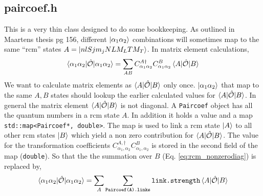 \documentclass[10pt]{article}
\begin{document}
\subsection{paircoef.h}
This is a very thin class designed to do some bookkeeping. As outlined in Maartens thesis pg 156, different $\ket{\alpha_1 \alpha_2}$ combinations will sometimes map to the same ``rcm'' states $A = \ket{ nlSjm_j NLM_L TM_T}$. In matrix element calculations,
\begin{align}
	\braket{\alpha_1 \alpha_2 | \hat{\mathcal{O}} | \alpha_1 \alpha_2} = \sum_{AB} C_{\alpha_1 \alpha_2}^{A \dagger} C_{\alpha_1 \alpha_2}^{B} \braket {A | \hat{\mathcal{O}} | B }
	\label{eq:rcm_nonzerodiag}
\end{align}
We want to calculate matrix elements as $\braket{ A | \hat{\mathcal{O}} | B}$ only once. $\ket{\alpha_1 \alpha_2}$ that map to the same $A,B$ states should lookup the earlier calculated values for $\braket{ A | \hat{\mathcal{O}} | B}$.
In general the matrix element $\braket{ A | \hat{\mathcal{O}} | B }$ is not diagonal. 
A \texttt{Paircoef} object has all the quantum numbers in a rcm state $A$. In addition it holds a value and a map \texttt{ std::map<Paircoef*, double>}. The map is used to link a rcm state $\ket{A}$ to all other rcm states $\ket{B}$ which yield a non zero contribution for $\braket{ A | \hat{\mathcal{O}} | B }$. The value for the transformation coefficients $C_{\alpha_1,\alpha_2}^{A,\dagger} C_{\alpha_1,\alpha_2}^{B}$ is stored in the second field of the map (\texttt{double}). So that the the summation over $B$ (Eq. \ref{eq:rcm_nonzerodiag}) is replaced by,
\begin{align}
	\braket{\alpha_1 \alpha_2 | \hat{\mathcal{O}} | \alpha_1 \alpha_2} = \sum_{A} \sum_{\texttt{Paircoef(A).links}}  \texttt{link.strength} \braket {A | \hat{\mathcal{O}} | B }
\end{align}
\end{document}
